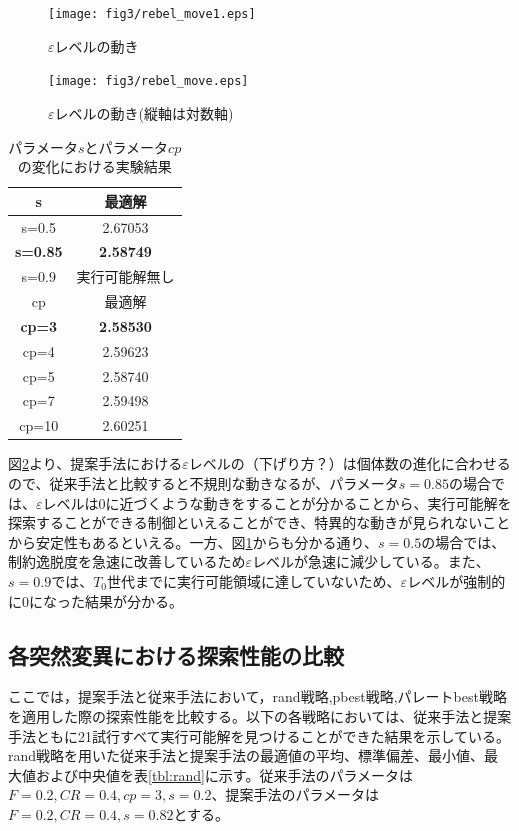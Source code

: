 \documentclass[a4paper,12pt]{jsreport}
\begin{document}
\begin{figure}[htbp]
  \centering
  \texttt{[image: fig3/rebel\_move1.eps]}
  \caption{$\varepsilon$レベルの動き}
  \label{fig:εレベルの動き1}
\end{figure}
\begin{figure}[htbp]
  \centering
  \texttt{[image: fig3/rebel\_move.eps]}
  \caption{$\varepsilon$レベルの動き(縦軸は対数軸)}
  \label{fig:εレベルの動き}
\end{figure}

\begin{table}[htbp]
\begin{center}
\caption{パラメータ$s$とパラメータ$cp$の変化における実験結果}
\label{tbl:s_cp}
\begin{tabular}{|c|c|}
\hline
 s  & 最適解 \\ \hline
 s=0.5 & 2.67053	\\ \hline
 \bf s=0.85 & \bf2.58749 \\ \hline
 s=0.9 & 実行可能解無し \\ \hline\hline
 cp & 最適解 \\ \hline
 \bf cp=3 & \bf2.58530	\\ \hline
 cp=4 & 2.59623\\ \hline
 cp=5 & 2.58740 \\ \hline
 cp=7 & 2.59498	\\ \hline
 cp=10 & 2.60251 \\ \hline
\end{tabular}
\end{center}
\end{table}

図\ref{fig:εレベルの動き}より、提案手法における$\varepsilon$レベルの（下げり方？）は個体数の進化に合わせるので、従来手法と比較すると不規則な動きなるが、パラメータ$s=0.85$の場合では、$\varepsilon$レベルは0に近づくような動きをすることが分かることから、実行可能解を探索することができる制御といえることができ、特異的な動きが見られないことから安定性もあるといえる。一方、図\ref{fig:εレベルの動き1}からも分かる通り、$s=0.5$の場合では、制約逸脱度を急速に改善しているため$\varepsilon$レベルが急速に減少している。また、$s=0.9$では、$T_{0}$世代までに実行可能領域に達していないため、$\varepsilon$レベルが強制的に0になった結果が分かる。


\subsection{各突然変異における探索性能の比較}
ここでは，提案手法と従来手法において，rand戦略,pbest戦略,パレートbest戦略を適用した際の探索性能を比較する。以下の各戦略においては、従来手法と提案手法ともに21試行すべて実行可能解を見つけることができた結果を示している。
rand戦略を用いた従来手法と提案手法の最適値の平均、標準偏差、最小値、最大値および中央値を表\ref{tbl:rand}に示す。従来手法のパラメータは$F=0.2,CR=0.4,cp=3,s=0.2$、提案手法のパラメータは$F=0.2,CR=0.4,s=0.82$とする。
\end{document}
